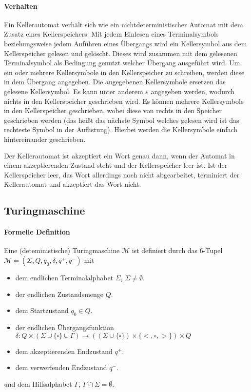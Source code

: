 \paragraph{Verhalten}
Ein Kellerautomat verhält sich wie ein nichtdeterministischer Automat mit dem Zusatz eines Kellerspeichers. Mit jedem Einlesen eines Terminalsymbols beziehungsweise jedem Auführen eines Übergangs wird ein Kellersymbol aus dem Kellerspeicher gelesen und gelöscht. Dieses wird zusammen mit dem gelesenen Terminalsymbol als Bedingung genutzt welcher Übergang ausgeführt wird. Um ein oder mehrere Kellersymbole in den Kellerspeicher zu schreiben, werden diese in dem Übergang angegeben. Die angegebenen Kellersymbole ersetzen das gelesene Kellersymbol. Es kann unter anderem $ \varepsilon $ angegeben werden, wodurch nichts in den Kellerspeicher geschrieben wird. Es können mehrere Kellersymbole in den Kellerspeicher geschrieben, wobei diese von rechts in den Speicher geschrieben werden (das heißt das nächste Symbol welches gelesen wird ist das rechteste Symbol in der Auflistung). Hierbei werden die Kellersymbole einfach hintereinander geschrieben.

Der Kellerautomat ist akzeptiert ein Wort genau dann, wenn der Automat in einem akzeptierenden Zustand steht und der Kellerspeicher leer ist. Ist der Kellerspeicher leer, das Wort allerdings noch nicht abgearbeitet, terminiert der Kellerautomat und akzeptiert das Wort nicht.


\subsection{Turingmaschine}
\paragraph{Formelle Definition}
Eine (deteministische) Turingmaschine $ \mathcal{M} $ ist definiert durch das 6-Tupel $ \mathcal{M} = (\Sigma, Q, q _ 0, \delta, q ^ +, q ^ -) $ mit
\begin{itemize}
	\item dem endlichen Terminalalphabet $ \Sigma $, $ \Sigma \neq \emptyset $.
	\item der endlichen Zustandsmenge $ Q $.
	\item dem Startzustand $ q _ 0 \in Q $.
	\item der endlichen Übergangsfunktion $ \delta : Q \times (\Sigma \cup \{ \square \} \cup \Gamma) \rightarrow ((\Sigma \cup \{ \square \}) \times \{ <, \circ, > \}) \times Q $
	\item dem akzeptierenden Endzustand $ q ^ + $.
	\item dem verwerfenden Endzustand $ q ^ - $.
\end{itemize}
und dem Hilfsalphabet $ \Gamma $, $ \Gamma \cap \Sigma = \emptyset $.

